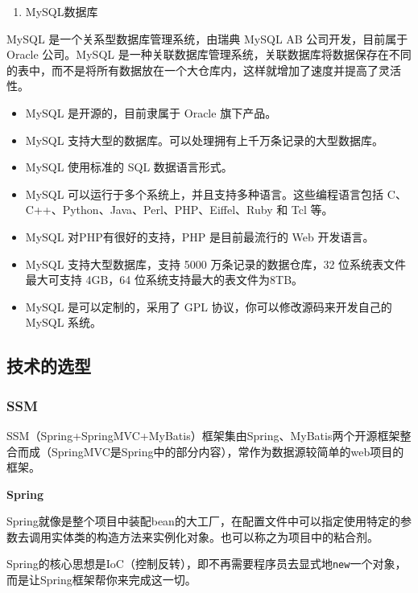 \documentclass[
]{article}
\begin{document}
\begin{enumerate}
\def\labelenumi{\arabic{enumi}.}
\item
  MySQL数据库
\end{enumerate}

MySQL 是一个关系型数据库管理系统，由瑞典 MySQL AB 公司开发，目前属于
Oracle 公司。MySQL
是一种关联数据库管理系统，关联数据库将数据保存在不同的表中，而不是将所有数据放在一个大仓库内，这样就增加了速度并提高了灵活性。

\begin{itemize}
\item
  MySQL 是开源的，目前隶属于 Oracle 旗下产品。
\item
  MySQL 支持大型的数据库。可以处理拥有上千万条记录的大型数据库。
\item
  MySQL 使用标准的 SQL 数据语言形式。
\item
  MySQL 可以运行于多个系统上，并且支持多种语言。这些编程语言包括
  C、C++、Python、Java、Perl、PHP、Eiffel、Ruby 和 Tcl 等。
\item
  MySQL 对PHP有很好的支持，PHP 是目前最流行的 Web 开发语言。
\item
  MySQL 支持大型数据库，支持 5000 万条记录的数据仓库，32
  位系统表文件最大可支持 4GB，64 位系统支持最大的表文件为8TB。
\item
  MySQL 是可以定制的，采用了 GPL 协议，你可以修改源码来开发自己的 MySQL
  系统。
\end{itemize}

\hypertarget{ux6280ux672fux7684ux9009ux578b}{%
\subsection{技术的选型}\label{ux6280ux672fux7684ux9009ux578b}}

\hypertarget{ssm}{%
\subsubsection{SSM}\label{ssm}}

SSM（Spring+SpringMVC+MyBatis）框架集由Spring、MyBatis两个开源框架整合而成（SpringMVC是Spring中的部分内容），常作为数据源较简单的web项目的框架。

\textbf{Spring}

Spring就像是整个项目中装配bean的大工厂，在配置文件中可以指定使用特定的参数去调用实体类的构造方法来实例化对象。也可以称之为项目中的粘合剂。

Spring的核心思想是IoC（控制反转），即不再需要程序员去显式地\texttt{new}一个对象，而是让Spring框架帮你来完成这一切。
\end{document}
